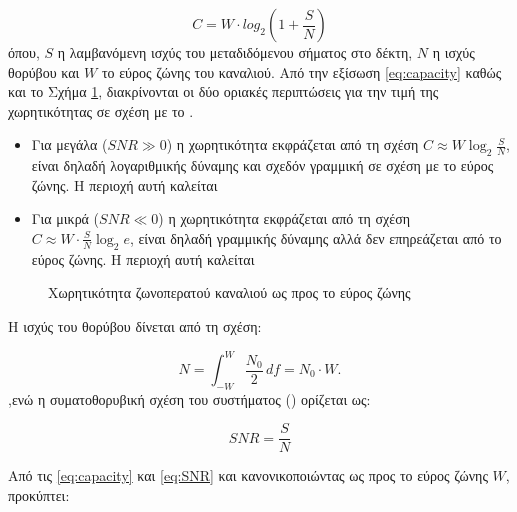 \begin{equation}
C=W\cdot log_2(1+ \frac{S}{N})
\label{eq:capacity}
\end{equation}
όπου, $S$ η λαμβανόμενη ισχύς του μεταδιδόμενου σήματος στο δέκτη, $N$ η ισχύς θορύβου και $W$ το εύρος ζώνης του καναλιού. Από την εξίσωση \ref{eq:capacity} καθώς και το Σχήμα \ref{fig:Channel capacity}, διακρίνονται οι δύο οριακές περιπτώσεις για την τιμή της χωρητικότητας σε σχέση με το .
\begin{itemize}
\item Για μεγάλα  ($SNR \gg 0$) η χωρητικότητα εκφράζεται από τη σχέση $C\approx W\log_{2}{\frac{S}{N}}$, είναι δηλαδή λογαριθμικής δύναμης και σχεδόν γραμμική σε σχέση με το εύρος ζώνης. Η περιοχή αυτή καλείται \textit{}
\item Για μικρά  ($SNR \ll 0$) η χωρητικότητα εκφράζεται από τη σχέση $C\approx W\cdot\frac{S}{N}\log_{2}{e}$, είναι δηλαδή γραμμικής δύναμης αλλά δεν επηρεάζεται από το εύρος ζώνης. Η περιοχή αυτή καλείται \textit{}
\end{itemize}


\begin{figure}[h]
\caption{Χωρητικότητα ζωνοπερατού καναλιού ως προς το εύρος ζώνης}
\label{fig:Channel capacity}
\end{figure}

Η ισχύς του θορύβου δίνεται από τη σχέση:

\begin{equation}
N = \int_{-W}^{W}\frac{N_0}{2}\,df=N_0\cdot{W}.
\label{eq:Noise}
\end{equation}
,ενώ η συματοθορυβική σχέση του συστήματος () ορίζεται ως:

\begin{equation}
SNR=\frac{S}{N}
\label{eq:SNR}
\end{equation}

Από τις \ref{eq:capacity} και \ref{eq:SNR} και κανονικοποιώντας ως προς το εύρος ζώνης $W$, προκύπτει:

